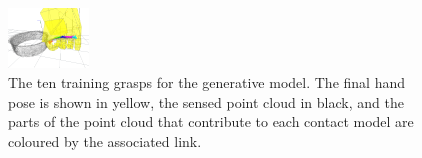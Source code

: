 \begin{figure}
\includegraphics[width=0.19\textwidth]{images/contact-viewall10}
\caption{The ten training grasps for the generative model. The final hand pose is shown in yellow, the sensed point cloud in black, and the parts of the point cloud that contribute to each contact model are coloured by the associated link. \label{fig:generative-training}}
\end{figure}